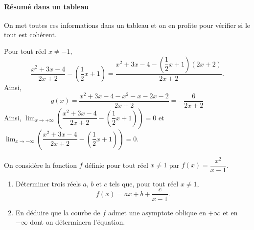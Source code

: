 \documentclass[11pt,fleqn, openany]{book} %
\begin{document}
\begin{solution}
\paragraph{Résumé dans un tableau}

On met toutes ces informations dans un tableau et on en profite pour vérifier si le tout est cohérent.

\begin{center}
\end{center}

Pour tout réel $x\neq -1$, 
\[ \dfrac{x^2+3x-4}{2x+2} - \left(\dfrac{1}{2}x+1\right)=\dfrac{x^2+3x-4-\left(\dfrac{1}{2}x+1\right)(2x+2)}{2x+2}.\]
Ainsi,
\[g(x)=\dfrac{x^2+3x-4-x^2-x-2x-2}{2x+2}=-\dfrac{6}{2x+2}\]
Ainsi, $\displaystyle\lim_{x \to +\infty} \left(\dfrac{x^2+3x-4}{2x+2} - \left(\dfrac{1}{2}x+1\right)\right)=0$ et $\displaystyle\lim_{x \to -\infty} \left(\dfrac{x^2+3x-4}{2x+2} - \left(\dfrac{1}{2}x+1\right)\right)=0$.

\begin{center}
\end{center}

\end{solution}




\begin{exercise}[topic=lim24]On considère la fonction $f$ définie pour tout réel $x \neq 1$ par $f(x)=\dfrac{x^2}{x-1}$.
\begin{enumerate}
\item Déterminer trois réels $a$, $b$ et $c$ tels que, pour tout réel $x\neq 1$, 
\[f(x)=ax+b+\dfrac{c}{x-1}.\]
\item En déduire que la courbe de $f$ admet une asymptote oblique en $+\infty$ et en $-\infty$ dont on déterminera l'équation.
\end{enumerate}\end{exercise}
\end{document}
